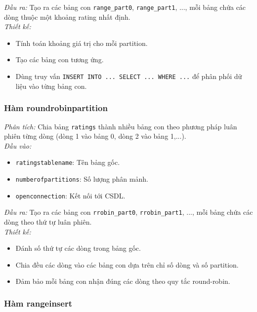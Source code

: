 \documentclass[a4paper]{article}
\begin{document}
\textit{Đầu ra:}  
Tạo ra các bảng con \texttt{range\_part0}, \texttt{range\_part1}, ..., mỗi bảng chứa các dòng thuộc một khoảng rating nhất định.\\

\textit{Thiết kế:}
\begin{itemize}
    \item Tính toán khoảng giá trị cho mỗi partition.
    \item Tạo các bảng con tương ứng.
    \item Dùng truy vấn \texttt{INSERT INTO ... SELECT ... WHERE ...} để phân phối dữ liệu vào từng bảng con.
\end{itemize}


\subsubsection{Hàm roundrobinpartition}

\textit{Phân tích:}  
Chia bảng \texttt{ratings} thành nhiều bảng con theo phương pháp luân phiên từng dòng (dòng 1 vào bảng 0, dòng 2 vào bảng 1,...).\\

\textit{Đầu vào:}
\begin{itemize}
    \item \texttt{ratingstablename}: Tên bảng gốc.
    \item \texttt{numberofpartitions}: Số lượng phân mảnh.
    \item \texttt{openconnection}: Kết nối tới CSDL.\\
\end{itemize}

\textit{Đầu ra:}  
Tạo ra các bảng con \texttt{rrobin\_part0}, \texttt{rrobin\_part1}, ..., mỗi bảng chứa các dòng theo thứ tự luân phiên.\\

\textit{Thiết kế:}
\begin{itemize}
    \item Đánh số thứ tự các dòng trong bảng gốc.
    \item Chia đều các dòng vào các bảng con dựa trên chỉ số dòng và số partition.
    \item Đảm bảo mỗi bảng con nhận đúng các dòng theo quy tắc round-robin.
\end{itemize}

\subsubsection{Hàm rangeinsert}
\end{document}
